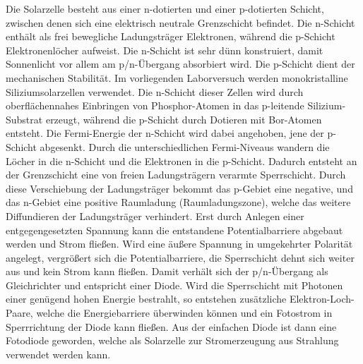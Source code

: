 \documentclass[english, ngerman]{scrartcl}
\begin{document}
Die Solarzelle besteht aus einer n-dotierten und einer p-dotierten Schicht, zwischen denen sich eine elektrisch neutrale Grenzschicht befindet. Die n-Schicht enthält als frei bewegliche Ladungsträger Elektronen, während die p-Schicht Elektronenlöcher aufweist. Die n-Schicht ist sehr dünn konstruiert, damit Sonnenlicht vor allem am p/n-Übergang absorbiert wird. Die p-Schicht dient der mechanischen Stabilität. Im vorliegenden Laborversuch werden monokristalline Siliziumsolarzellen verwendet. Die n-Schicht dieser Zellen wird durch oberflächennahes Einbringen von Phosphor-Atomen in das p-leitende Silizium-Substrat erzeugt, während die p-Schicht durch Dotieren mit Bor-Atomen entsteht. Die Fermi-Energie der n-Schicht wird dabei angehoben, jene der p-Schicht abgesenkt. Durch die unterschiedlichen Fermi-Niveaus wandern die Löcher in die n-Schicht und die Elektronen in die p-Schicht. Dadurch entsteht an der Grenzschicht eine von freien Ladungsträgern verarmte Sperrschicht. Durch diese Verschiebung der Ladungsträger bekommt das p-Gebiet eine negative, und das n-Gebiet eine positive Raumladung (Raumladungszone), welche das weitere Diffundieren der Ladungsträger verhindert. Erst durch Anlegen einer entgegengesetzten Spannung kann die entstandene Potentialbarriere abgebaut werden und Strom fließen. Wird eine äußere Spannung in umgekehrter Polarität angelegt, vergrößert sich die Potentialbarriere, die Sperrschicht dehnt sich weiter aus und kein Strom kann fließen. Damit verhält sich der p/n-Übergang als Gleichrichter und entspricht einer Diode. Wird die Sperrschicht mit Photonen einer genügend hohen Energie bestrahlt, so entstehen zusätzliche Elektron-Loch-Paare, welche die Energiebarriere überwinden können und ein Fotostrom in Sperrrichtung der Diode kann fließen. Aus der einfachen Diode ist dann eine Fotodiode geworden, welche als Solarzelle zur Stromerzeugung aus Strahlung verwendet werden kann.
\end{document}

